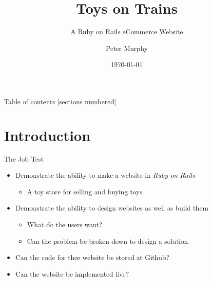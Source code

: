 \documentclass[10pt]{beamer}
\title{Toys on Trains}
\subtitle{A Ruby on Rails eCommerce Website}
\date{\today}
\author{Peter Murphy}
\institute{Center for modern beamer themes}
\begin{document}
\maketitle

\begin{frame}{Table of contents}
  [sections numbered]
  \tableofcontents[hideallsubsections]
\end{frame}

\section{Introduction}

\begin{frame}[fragile]{The Job Test}

	\begin{itemize}
		\item Demonstrate the ability to make a website in \emph{Ruby on Rails}
    	\begin{itemize}
		\item A toy store for selling and buying toys
	\end{itemize}
		\item Demonstrate the ability to design websites as well as build them
    	\begin{itemize}
		    \item What do the users want?
    		\item Can the problem be broken down to design a solution.
	\end{itemize}
  \item Can the code for thee website be stored at Github?
  \item Can the website be implemented live?
  
	\end{itemize}

\end{frame}
\end{document}
